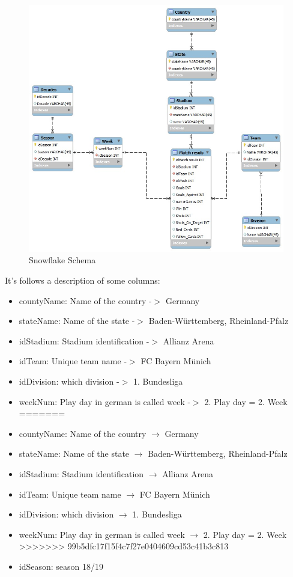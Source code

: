 \documentclass[11pt, journal]{IEEEtran}
\begin{document}
\begin{figure}[htb]
	\centering
		\includegraphics[width=1.0\columnwidth]{images/Snowflake}
	\caption{Snowflake Schema}
	\label{fig:probov}
\end{figure}

It’s follows a description of some columns:

\begin{itemize}
<<<<<<< HEAD
  \item countyName: Name of the country -$>$ Germany
  \item stateName: Name of the state -$>$ Baden-Württemberg, Rheinland-Pfalz
  \item idStadium: Stadium identification -$>$ Allianz Arena
  \item idTeam: Unique team name -$>$ FC Bayern Münich 
  \item idDivision: which division -$>$ 1. Bundesliga
  \item weekNum: Play day in german is called week -$>$ 2. Play day = 2. Week 
=======
  \item countyName: Name of the country \(\rightarrow\) Germany
  \item stateName: Name of the state \(\rightarrow\) Baden-Württemberg, Rheinland-Pfalz
  \item idStadium: Stadium identification \(\rightarrow\) Allianz Arena
  \item idTeam: Unique team name \(\rightarrow\) FC Bayern Münich 
  \item idDivision: which division \(\rightarrow\) 1. Bundesliga
  \item weekNum: Play day in german is called week \(\rightarrow\) 2. Play day = 2. Week 
>>>>>>> 99b5dfc17f15f4c7f27e0404609cd53c41b3c813
  \item idSeason: season 18/19 
\end{itemize}
\end{document}
